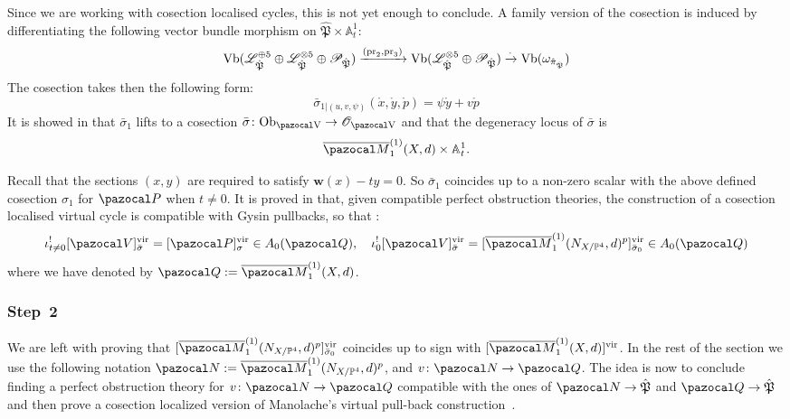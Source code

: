 \documentclass[11pt]{amsart}
\newcommand{\Mone}[3]{\overline{\pazocal M}^{(1)}_{#1}(#2,#3)}
\newcommand{\PP}{\mathbb P}
\newcommand{\OO}{\mathcal O}
\renewcommand{\to}{\rightarrow}
\newcommand{\pr}{\rm{pr}}
\newcommand{\Aaff}{\mathbb A}
\newcommand{\hP}{\hat{\mathfrak P}}
\newcommand{\w}{\mathbf{w}}
\theoremstyle{plain}
\theoremstyle{definition}
\begin{document}
Since we are working with cosection localised cycles, this is not yet enough to conclude.
 A family version of the cosection is induced by differentiating the following vector bundle morphism on $\hP\times\Aaff^1_t$:
\[
 \rm{Vb}(\mathcal L_{\hP}^{\oplus 5}\oplus\mathcal L_{\hP}^{\otimes 5}\oplus\mathcal P_{\hP})\xrightarrow{(\pr_2,\pr_3)}\rm{Vb}(\mathcal L_{\hP}^{\otimes 5}\oplus\mathcal P_{\hP})\xrightarrow{\cdot}\rm{Vb}(\omega_{\hat\pi_{\hP}})
\]
The cosection takes then the following form:
\[\bar\sigma_{1|(u,v,\psi)}(\mathring{x},\mathring{y},\mathring{p})=\psi\mathring{y}+v\mathring{p}\]
It is showed in \cite[\S4.7]{CLpfields} that $\bar\sigma_1$ lifts to a cosection $\bar\sigma\colon \rm{Ob}_{\pazocal V}\to \OO_{\pazocal V}$ and that the degeneracy locus of $\bar\sigma$ is 
\[\Mone{1}{X}{d}\times\Aaff^1_t.\]

Recall that the sections $(x,y)$ are required to satisfy $\w(x)-ty=0$. So $\bar\sigma_1$ coincides up to a non-zero scalar with the above defined cosection $\sigma_1$ for $\pazocal P$ when $t\neq 0$. It is proved in \cite[Theorem 5.2]{KLcosection} that, given compatible perfect obstruction theories, the construction of a cosection localised virtual cycle is compatible with Gysin pullbacks, so that \cite[Proposition 4.9]{CLpfields}:
\[
 \iota_{t\neq0}^![\pazocal V]^{\rm{vir}}_{\rm{\bar\sigma}}=[\pazocal P]^{\rm{vir}}_{\rm{\sigma}}\in A_0(\pazocal Q),\quad \iota_{0}^![\pazocal V]^{\rm{vir}}_{\rm{\bar\sigma}}=[\Mone{1}{N_{X/\PP^4}}{d}^p]^{\rm{vir}}_{\rm{\bar\sigma_0}}\in A_0(\pazocal Q)
\]
where we have denoted by $\pazocal Q:=\Mone{1}{X}{d}$.
\subsubsection*{Step~2}
We are left with proving that $[\Mone{1}{N_{X/\PP^4}}{d}^p]^{\rm{vir}}_{\rm{\bar\sigma_0}}$ coincides up to sign with $[\Mone{1}{X}{d}]^{\rm{vir}}$.
In the rest of the section we use the following notation $\pazocal N:=\Mone{1}{N_{X/\PP^4}}{d}^p$, and $v\colon\pazocal N\to\pazocal Q$. 
The idea is now to conclude finding a perfect obstruction theory for $v\colon\pazocal N\to\pazocal Q$ compatible with the ones of $\pazocal N\to\hP$ and $\pazocal Q\to\hP$ and then prove a cosection localized version of Manolache's virtual pull-back construction~\cite{Manolache-pullback}.
\end{document}
